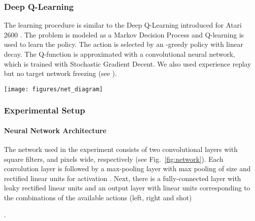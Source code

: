 \documentclass[english,american,conference, balance]{IEEEtran}
\begin{document}
\subsubsection{Deep Q-Learning\label{subsec:Deep-Q-Learning}}

The learning procedure is similar to the Deep Q-Learning introduced
for Atari 2600 \cite{mnih-dqn-2015}. The problem is modeled as a
Markov Decision Process and Q-learning \cite{watkins:mlj92} is used
to learn the policy. The action is selected by an -greedy
policy with linear  decay. The Q-function is approximated
with a convolutional neural network, which is trained with Stochastic
Gradient Decent. We also used experience replay but no target network
freezing (see \cite{mnih-dqn-2015}). 

\begin{figure*}
\texttt{[image: figures/net\_diagram]} \caption{\label{fig:network}Architecture of the convolutional neural network
used for the experiment.}
\end{figure*}


\subsubsection{Experimental Setup}

\paragraph{Neural Network Architecture}

The network used in the experiment consists of two convolutional layers
with  square filters,  and  pixels wide, respectively
(see Fig.~\ref{fig:network}). Each convolution layer is followed
by a max-pooling layer with max pooling of size  and rectified
linear units for activation \cite{AISTATS2011_GlorotBB11}. Next,
there is a fully-connected layer with  leaky rectified linear
units \cite{Maas2013} and an output layer with  linear units
corresponding to the  combinations of the  available actions
(left, right and shot)\begin{comment}
Zastanawiajace jest to dlaczego w\l a\'{s}ciwie 8, skoro 3 by wystarczy\l y
- tak wiem Mnih tez tak robil// Nie do ko\'{n}ca 3 wystarcz\k{a} bo
mo\.{z}na i\'{s}\'{c} i strzela\'{c} wi\k{e}c w tym przypadku dopiero
7 jest wyczerpuj\k{a}ce. 8 jest bli\.{z}sze temu jak cz\l owiek gra
- wciskaj\k{a}c przyciski. W miedzyczasie robi\l em z 3 bo mniej akcji
mimo wszystko. To kwestia interpretacji wyjsc. Skoro mamy 8 kombinacji
akcji to 3 binarne wyjscia wystarczaja zeby je obsluzyc. /nie wiem
jak mo\.{z}na u\.{z}y\'{c} wyj\'{s}\'{c} binarnych je\'{s}li outputem
sieci jest Q. Ma Pan racje. Ale to ciekawe pytanie (badawcze), prawda?
Bo jesli mam 30 mozliwych akcji (vide octopus), to 2{*}30 przestaje
byc wesole.
\end{comment}
.
\end{document}
